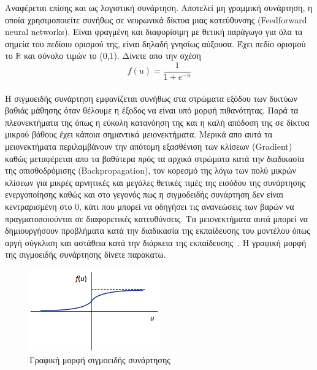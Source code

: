 \documentclass[12pt]{article}
\numberwithin{equation}{section}
\begin{document}
Αναφέρεται επίσης και ως λογιστική συνάρτηση. Αποτελεί μη γραμμική συνάρτηση, η οποία χρησιμοποιείτε συνήθως σε νευρωνικά δίκτυα μιας κατεύθυνσης (Feedforward neural networks). Είναι φραγμένη και διαφορίσιμη με θετική παράγωγο για όλα τα σημεία του πεδίοιυ ορισμού της, είναι δηλαδή γνησίως αύξουσα. Έχει πεδίο ορισμού το \(\mathbb{R}\) και σύνολο τιμών το (0,1). Δίνετε απο την σχέση \\

\begin{equation}
f(u) = \frac{1}{1 + e^{-u}}
\end{equation}  \\

Η σιγμοειδής συνάρτηση εμφανίζεται συνήθως στα στρώματα εξόδου των δικτύων βαθιάς μάθησης όταν θέλουμε η έξοδος να είναι υπό μορφή πιθανότητας. Παρά τα πλεονεκτήματα της όπως η εύκολη κατανόηση της και η καλή απόδοση της σε δίκτυα μικρού βάθους έχει κάποια σημαντικά μειονεκτήματα. Μερικά απο αυτά τα μειονεκτήματα περιλαμβάνουν την απότομη εξασθένιση των κλίσεων (Gradient) καθώς μεταφέρεται απο τα βαθύτερα πρός τα αρχικά στρώματα κατά την διαδικασία της οπισθοδρόμισης (Backpropagation), τον κορεσμό της λόγω των πολύ μικρών κλίσεων για μικρές αρνητικές και μεγάλες θετικές τιμές της εισόδου της συνάρτησης ενεργοποίησης καθώς και στο γεγονός πως η σιγμοδειδής συνάρτηση δεν είναι κεντραρισμένη στο 0, κάτι που μπορεί να οδηγήσει τις ανανεώσεις των βαρών να πραγματοποιούνται σε διαφορετικές κατευθύνσεις. Τα μειονεκτήματα αυτά μπορεί να δημιουργήσουν προβλήματα κατά την διαδικασία της εκπαίδευσης του μοντέλου όπως αργή σύγκλιση και αστάθεια κατά την διάρκεια της εκπαίδευσης~\cite{nwankpa2018activationfunctionscomparisontrends}. Η γραφική μορφή της σιγμοειδής συνάρτησης δίνετε παρακατω. \\

\begin{figure}[h!]
  \centering
  \includegraphics[width=0.5\textwidth]{images/Sigmoid.png} %
  \caption{Γραφική μορφή σιγμοειδής συνάρτησης}
  \label{figure 12}
\end{figure}
\end{document}
